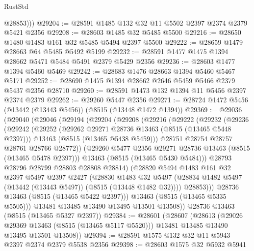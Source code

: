 \begin{lexlean}{RustStd}
\begin{coremodule}
          @28853)))
@29204 := @28591 @1485 @132 @32 @11 @5502 @2397 @2374 @2379 @5421 @2356
@29208 := @28603 @1485 @32 @5485 @5500
@29216 := @28650 @1480 @1483 @161 @32 @5485 @5494 @2397 @5500
@29222 := @28659 @1479 @28663 @64 @5485 @5492 @5199
@29232 := @28591 @1477 @1475 @1394 @28662 @5471 @5484 @5491 @2379 @5429 @2356
@29236 := @28603 @1477 @1394 @5460 @5469
@29242 := @28683 @1476 @28663 @1394 @5460 @5467 @5171
@29252 := @28690 @1475 @1394 @28662 @2646 @5459 @5466 @2379 @5437 @2356 @28710
@29260 := @28591 @1473 @132 @1394 @11 @5456 @2397 @2374 @2379
@29262 := @29260 @5447 @2356
@29271 := @28724 @1472 @5456 (@13442 (@13443 @5456)) (@8515 (@13448 @1472 @1394))
@29369 := @29036
    (@29040
      (@29046
        (@29194
          (@29204
            (@29208
              (@29216
                (@29222
                  (@29232
                    (@29236
                      (@29242
                        (@29252
                          (@29262 @29271 @28736 @13463 (@8515 (@13465 @5448 @2397)))
                          @13463
                          (@8515 (@13465 @5438 @5459)))
                        @28751
                        @28754
                        @28757
                        @28761
                        @28766
                        @28772))
                    (@29260 @5477 @2356 @29271 @28736 @13463 (@8515 (@13465 @5478 @2397)))
                    @13463
                    (@8515 (@13465 @5430 @5484)))
                  @28793
                  @28796
                  @28799
                  @28803
                  @28808
                  @28814)
                (@28820
                  @5494
                  @1483
                  @161
                  @32
                  @2397
                  @5497
                  @2397
                  @2427
                  (@28830
                    @1483
                    @32
                    @5497
                    (@28834 @1482 @5497 (@13442 (@13443 @5497)) (@8515 (@13448 @1482 @32))))
                  @28853)))
            @28736
            @13463
            (@8515 (@13465 @5422 @2397)))
          @13463
          (@8515 (@13465 @5335 @5505)))
        @13481
        @13485
        @13490
        @13495
        @13501
        @13508))
    @28736
    @13463
    (@8515 (@13465 @5327 @2397))
@29384 := @28601
    (@28607
      (@28613
        (@29026 @29369 @13463 (@8515 (@13465 @5117 @5520)))
        @13481
        @13485
        @13490
        @13495
        @13501
        @13508))
@29394 := @28591 @1575 @132 @32 @11 @5943 @2397 @2374 @2379 @5538 @2356
@29398 := @28603 @1575 @32 @5932 @5941

\end{coremodule}
\end{lexlean}
